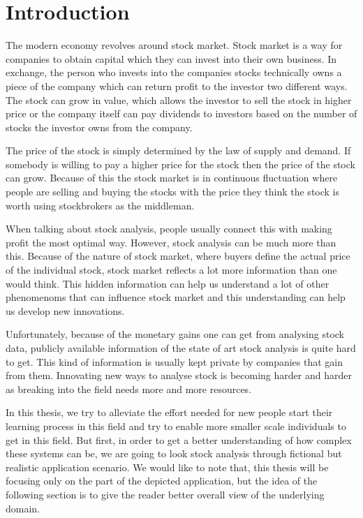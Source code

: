 \chapter{Introduction}
\label{chapter:intro}

The modern economy revolves around stock market.
Stock market is a way for companies to obtain capital which they can invest into their own business.
In exchange, the person who invests into the companies stocks technically owns a piece of the company which can return profit to the investor two different ways.
The stock can grow in value, which allows the investor to sell the stock in higher price or the company itself can pay dividends to investors based on the number of stocks the investor owns from the company.

The price of the stock is simply determined by the law of supply and demand. 
If somebody is willing to pay a higher price for the stock then the price of the stock can grow.
Because of this the stock market is in continuous fluctuation where people are selling and buying the stocks with the price they think the stock is worth using stockbrokers as the middleman. \cite{person}

When talking about stock analysis, people usually connect this with making profit the most optimal way.
However, stock analysis can be much more than this.
Because of the nature of stock market, where buyers define the actual price of the individual stock, stock market reflects a lot more information than one would think.
This hidden information can help us understand a lot of other phenomenoms that can influence stock market and this understanding can help us develop new innovations.

Unfortunately, because of the monetary gains one can get from analysing stock data, publicly available information of the state of art stock analysis is quite hard to get.
This kind of information is usually kept private by companies that gain from them.
Innovating new ways to analyse stock is becoming harder and harder as breaking into the field needs more and more resources.

In this thesis, we try to alleviate the effort needed for new people start their learning process in this field and try to enable more smaller scale individuals to get in this field.
But first, in order to get a better understanding of how complex these systems can be, we are going to look stock analysis through fictional but realistic application scenario.
We would like to note that, this thesis will be focusing only on the part of the depicted application, but the idea of the following section is to give the reader better overall view of the underlying domain.

